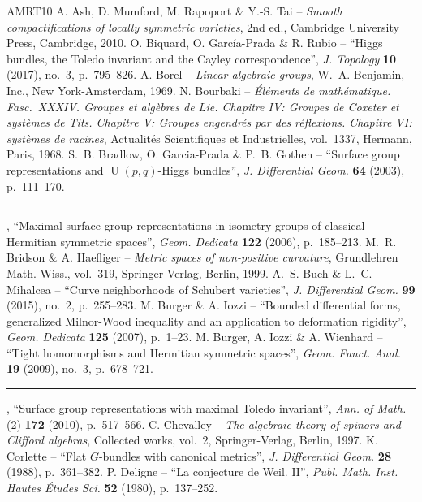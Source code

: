 \documentclass[10pt]{article}
\theoremstyle{definition}
\numberwithin{equation}{section}
\begin{document}
{\footnotesize
\begin{thebibliography}{AMRT10}
 A. Ash, D. Mumford, M. Rapoport \& Y.-S. Tai -- \emph{Smooth compactifications of locally symmetric varieties}, 2nd ed., Cambridge University Press, Cambridge, 2010.
 O. Biquard, O. García-Prada \& R. Rubio -- ``Higgs bundles, the Toledo invariant and the Cayley correspondence'', \emph{J. Topology} \textbf{10} (2017), no.~3, p.~795--826.
 A. Borel -- \emph{Linear algebraic groups}, W.~A. Benjamin, Inc., New York-Amsterdam, 1969.
 N. Bourbaki -- \emph{Éléments de mathématique. Fasc.~XXXIV. Groupes et algèbres de Lie. Chapitre IV: Groupes de Coxeter et systèmes de Tits. Chapitre V: Groupes engendrés par des réflexions. Chapitre VI: systèmes de racines}, Actualités Scientifiques et Industrielles, vol.~1337, Hermann, Paris, 1968.
 S.~B. Bradlow, O. Garcia-Prada \& P.~B. Gothen -- ``Surface group representations and $\operatorname U(p,q)$-Higgs bundles'', \emph{J. Differential Geom.} \textbf{64} (2003), p.~111--170.
 \rule{1.2em}{.1pt}, ``Maximal surface group representations in isometry groups of classical Hermitian symmetric spaces'', \emph{Geom. Dedicata} \textbf{122} (2006), p.~185--213.
 M.~R. Bridson \& A. Haefliger -- \emph{Metric spaces of non-positive curvature}, Grundlehren Math. Wiss., vol.~319, Springer-Verlag, Berlin, 1999.
 A.~S. Buch \& L.~C. Mihalcea -- ``Curve neighborhoods of Schubert varieties'', \emph{J. Differential Geom.} \textbf{99} (2015), no.~2, p.~255--283.
 M. Burger \& A. Iozzi -- ``Bounded differential forms, generalized Milnor-Wood inequality and an application to deformation rigidity'', \emph{Geom. Dedicata} \textbf{125} (2007), p.~1--23.
 M. Burger, A. Iozzi \& A. Wienhard -- ``Tight homomorphisms and Hermitian symmetric spaces'', \emph{Geom. Funct. Anal.} \textbf{19} (2009), no.~3, p.~678--721.
 \rule{1.2em}{.1pt}, ``Surface group representations with maximal Toledo invariant'', \emph{Ann. of Math.} (2) \textbf{172} (2010), p.~517--566.
 C. Chevalley -- \emph{The algebraic theory of spinors and Clifford algebras}, Collected works, vol.~2, Springer-Verlag, Berlin, 1997.
 K. Corlette -- ``Flat $G$-bundles with canonical metrics'', \emph{J. Differential Geom.} \textbf{28} (1988), p.~361--382.
 P. Deligne -- ``La conjecture de Weil. II'', \emph{Publ. Math. Inst. Hautes Études Sci.} \textbf{52} (1980), p.~137--252.

\end{thebibliography}}
\end{document}
